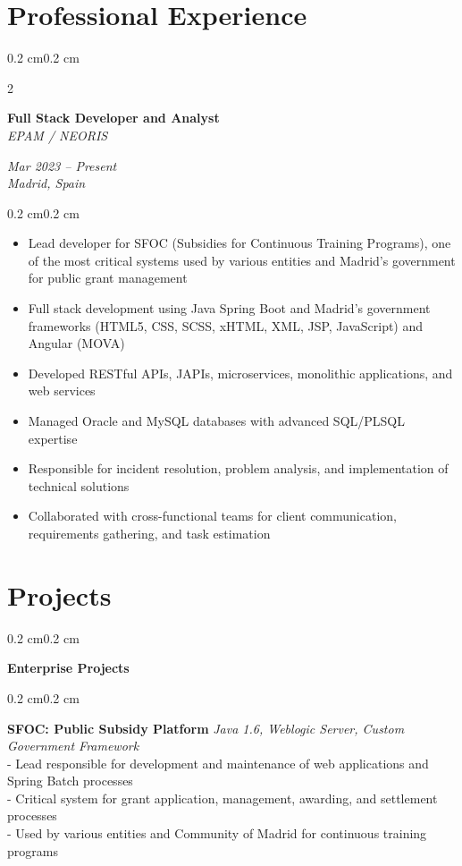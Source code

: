 \documentclass[10pt, letterpaper]{article}
\newenvironment{highlights}{
    \begin{itemize}[
        topsep=0.10 cm,
        parsep=0.10 cm,
        partopsep=0pt,
        itemsep=0pt,
        leftmargin=0.4 cm + 10pt
    ]
}{
    \end{itemize}
}
\newenvironment{onecolentry}{
    \begin{adjustwidth}{0.2 cm}{0.2 cm}
}{
    \end{adjustwidth}
}
\newenvironment{twocolentry}[2][]{
    \onecolentry
    \def\secondColumn{#2}
    \setcolumnwidth{\fill, 4.5 cm}
    \begin{paracol}{2}
}{
    \switchcolumn \raggedleft \secondColumn
    \end{paracol}
    \endonecolentry
}
\begin{document}
    \section{Professional Experience}
    \begin{twocolentry}{\textit{Mar 2023 -- Present}\\\textit{Madrid, Spain}}
        \textbf{Full Stack Developer and Analyst} \\
        \textit{EPAM / NEORIS}
    \end{twocolentry}
    \begin{onecolentry}
        \begin{highlights}
            \item Lead developer for SFOC (Subsidies for Continuous Training Programs), one of the most critical systems used by various entities and Madrid's government for public grant management
            \item Full stack development using Java Spring Boot and Madrid's government frameworks (HTML5, CSS, SCSS, xHTML, XML, JSP, JavaScript) and Angular (MOVA)
            \item Developed RESTful APIs, JAPIs, microservices, monolithic applications, and web services
            \item Managed Oracle and MySQL databases with advanced SQL/PLSQL expertise
            \item Responsible for incident resolution, problem analysis, and implementation of technical solutions
            \item Collaborated with cross-functional teams for client communication, requirements gathering, and task estimation
        \end{highlights}
    \end{onecolentry}

    \section{Projects}
    
    \begin{onecolentry}
        \textbf{Enterprise Projects}
    \end{onecolentry}

    \begin{onecolentry}
        \textbf{SFOC: Public Subsidy Platform} \hfill \textit{Java 1.6, Weblogic Server, Custom Government Framework} \\
        - Lead responsible for development and maintenance of web applications and Spring Batch processes \\
        - Critical system for grant application, management, awarding, and settlement processes \\
        - Used by various entities and Community of Madrid for continuous training programs
    \end{onecolentry}
    
\end{document}
